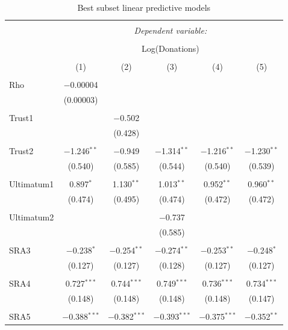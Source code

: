 \documentclass[12pt]{article}
\begin{document}
\begin{table}[!htbp] \centering 
  \caption{Best subset linear predictive models} 
  \label{} 
    \begin{adjustbox}{width=\textwidth}
\begin{tabular}{@{\extracolsep{5pt}}lccccc} 
\\[-1.8ex]\hline 
\hline \\[-1.8ex] 
 & \multicolumn{5}{c}{\textit{Dependent variable:}} \\ 
\cline{2-6} 
\\[-1.8ex] & \multicolumn{5}{c}{Log(Donations)} \\ 
\\[-1.8ex] & (1) & (2) & (3) & (4) & (5)\\ 
\hline \\[-1.8ex] 
 Rho & $-$0.00004 &  &  &  &  \\ 
  & (0.00003) &  &  &  &  \\ 
  & & & & & \\ 
  Trust1 &  & $-$0.502 &  &  &  \\ 
  &  & (0.428) &  &  &  \\ 
  & & & & & \\ 
 Trust2 & $-$1.246$^{**}$ & $-$0.949 & $-$1.314$^{**}$ & $-$1.216$^{**}$ & $-$1.230$^{**}$ \\ 
  & (0.540) & (0.585) & (0.544) & (0.540) & (0.539) \\ 
  & & & & & \\ 
 Ultimatum1 & 0.897$^{*}$ & 1.130$^{**}$ & 1.013$^{**}$ & 0.952$^{**}$ & 0.960$^{**}$ \\ 
  & (0.474) & (0.495) & (0.474) & (0.472) & (0.472) \\ 
  & & & & & \\ 
 Ultimatum2 &  &  & $-$0.737 &  &  \\ 
  &  &  & (0.585) &  &  \\ 
  & & & & & \\ 
 SRA3 & $-$0.238$^{*}$ & $-$0.254$^{**}$ & $-$0.274$^{**}$ & $-$0.253$^{**}$ & $-$0.248$^{*}$ \\ 
  & (0.127) & (0.127) & (0.128) & (0.127) & (0.127) \\ 
  & & & & & \\ 
 SRA4 & 0.727$^{***}$ & 0.744$^{***}$ & 0.749$^{***}$ & 0.736$^{***}$ & 0.734$^{***}$ \\ 
  & (0.148) & (0.148) & (0.148) & (0.148) & (0.147) \\ 
  & & & & & \\ 
 SRA5 & $-$0.388$^{***}$ & $-$0.382$^{***}$ & $-$0.393$^{***}$ & $-$0.375$^{***}$ & $-$0.352$^{**}$ \\ 

\end{tabular}
\end{adjustbox}
\end{table}
\end{document}

